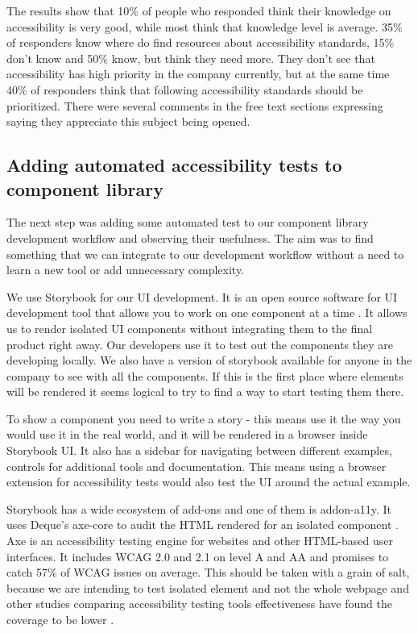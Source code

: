 \documentclass{master_thesis}
\begin{document}
The results show that 10\% of people who responded think their knowledge on accessibility is very good, while most think that knowledge level is average. 35\% of responders know where do find resources about accessibility standards, 15\% don't know and 50\% know, but think they need more. They don't see that accessibility has high priority in the company currently, but at the same time 40\% of responders think that following accessibility standards should be prioritized. There were several comments in the free text sections expressing saying they appreciate this subject being opened.

\subsection{Adding automated accessibility tests to component library}
The next step was adding some automated test to our component library development workflow and observing their usefulness. The aim was to find something that we can integrate to our development workflow without a need to learn a new tool or add unnecessary complexity.

We use Storybook for our UI development. It is an open source software for UI development tool that allows you to work on one component at a time \citep{storybook}. It allows us to render isolated UI components without integrating them to the final product right away. Our developers use it to test out the components they are developing locally. We also have a version of storybook available for anyone in the company to see with all the components. If this is the first place where elements will be rendered it seems logical to try to find a way to start testing them there.

To show a component you need to write a story - this means use it the way you would use it in the real world, and it will be rendered in a browser inside Storybook UI. It also has a sidebar for navigating between different examples, controls for additional tools and documentation. This means using a browser extension for accessibility tests would also test the UI around the actual example.

Storybook has a wide ecosystem of add-ons and one of them is addon-a11y. It uses Deque's axe-core to audit the HTML rendered for an isolated component \citep{addon-a11y}. Axe is an accessibility testing engine for websites and other HTML-based user interfaces. It includes WCAG 2.0 and 2.1 on level A and AA and promises to catch 57\% of WCAG issues on average. \citep{Deque2023} This should be taken with a grain of salt, because we are intending to test isolated element and not the whole webpage and other studies comparing accessibility testing tools effectiveness have found the coverage to be lower  .
\end{document}
